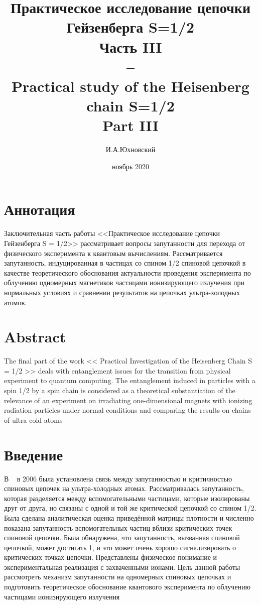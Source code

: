 \documentclass[11pt]{article}
\title{\textbf{Практическое исследование цепочки Гейзенберга S=1/2 \\ Часть III \\ -- \\ 
	Practical study of the Heisenberg chain S=1/2 \\ Part III}}
\author{И.А.Юхновский}
\date{ноябрь 2020}
\begin{document}
\maketitle
\thispagestyle{empty}
\section*{Аннотация}
Заключительная часть работы <<Практическое исследование цепочки Гейзенберга S = 1/2>> рассматривает вопросы запутанности для перехода от физического эксперимента к квантовым вычислениям. Рассматривается запутанность, индуцированная в частицах со спином 1/2 спиновой цепочкой в качестве теоретического обоснования актуальности проведения эксперимента по облучению одномерных магнетиков частицами ионизирующего излучения при нормальных условиях и сравнении результатов на цепочках ультра-холодных атомов. 


\section*{Abstract}
The final part of the work << Practical Investigation of the Heisenberg Chain S = 1/2 >> deals with entanglement issues for the transition from physical experiment to quantum computing. The entanglement induced in particles with a spin 1/2 by a spin chain is considered as a theoretical substantiation of the relevance of an experiment on irradiating one-dimensional magnets with ionizing radiation particles under normal conditions and comparing the results on chains of ultra-cold atoms

\tableofcontents{}

\section{Введение}
 В ~\cite{yi} в 2006 была установлена связь между запутанностью и критичностью спиновых цепочек на ультра-холодных атомах. Рассматривалась запутанность, которая разделяется между вспомогательными частицами, которые изолированы друг от друга, но связаны с одной и той же критической цепочкой со спином 1/2. Была сделана аналитическая оценка приведённой матрицы плотности и численно показана запутанность вспомогательных частиц вблизи критических точек спиновой цепочки. Была обнаружена, что запутанность, вызванная спиновой цепочкой, может достигать 1, и это может очень хорошо сигнализировать о критических точках цепочки. Представлены физическое понимание и экспериментальная реализация с захваченными ионами. Цель данной работы рассмотреть механизм запутанности на одномерных спиновых цепочках и подготовить теоретическое обоснование квантового эксперимента по облучению частицами ионизирующего излучения
\end{document}
